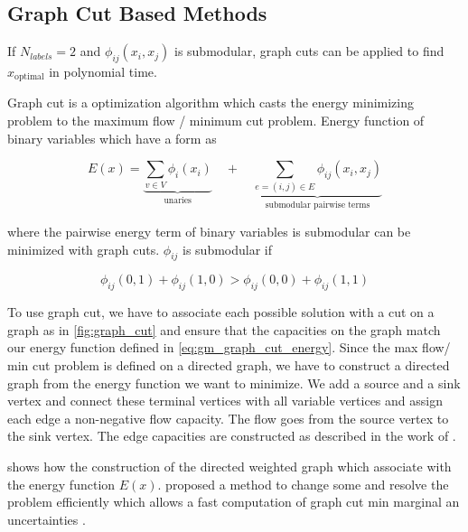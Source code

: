 \subsection{Graph Cut Based Methods}

If $N_{labels}=2$ and $\phi_{ij}(x_i,x_j)$ is submodular, 
graph cuts \cite{boykov_2001_pami,kolmogorov_2004_pami} can be applied to find $x_{\text{optimal}}$
in polynomial time.

Graph cut is a optimization algorithm which casts the energy minimizing problem
to the maximum flow / minimum cut problem. Energy function of binary variables which
have a form as 

\begin{equation} \label{eq:gm_graph_cut_energy}
    E(x) = 
    \underbrace{
        \sum_{v \in V} \phi_i(x_i)
    }_{\text{unaries}}
     \quad +  \quad
    \underbrace{
        \sum_{e=(i,j) \in E } \phi_{ij}(x_i,x_j) 
    }_{\text{submodular pairwise terms}}
\end{equation}



where the pairwise energy term of binary variables is submodular can be minimized with
graph cuts. $\phi_{ij}$ is submodular if

\begin{equation} \label{eq:gm_submodular_criterion}
    \phi_{ij}(0,1) + \phi_{ij}(1,0) >  \phi_{ij}(0,0) + \phi_{ij}(1,1)
\end{equation}

To use graph cut, we have to associate each possible solution with a cut on a graph as in
\cref{fig:graph_cut} and ensure that the capacities on the graph match our energy function 
defined in \cref{eq:gm_graph_cut_energy}.
Since the max flow/ min cut problem is defined on a directed graph, we have to construct
a directed graph from the energy function we want to minimize. We add a source and a
sink vertex and connect these terminal vertices with all variable vertices and assign
each edge a non-negative flow capacity. The flow goes from the source vertex to the
sink vertex. The edge capacities are constructed as described in the work of
\citet{kolmogorov_2004_pami}.

 shows how the
construction of the directed weighted graph which associate with the energy function $E(x)$.
\citet{kohli_2007_pami} proposed a method to change some and resolve
the problem efficiently which allows a fast computation
of graph cut min marginal an uncertainties \citep{kohli_2006_eccv,tarlow_2012_cvpr}.


